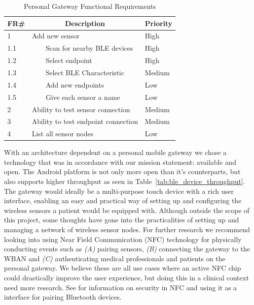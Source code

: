 \begin{table}[]
\centering
\caption{Personal Gateway Functional Requirements}
\label{tab:gatewayRequirements}
\begin{tabular}{|l|l|l|}
\hline
\textbf{FR\#} & \multicolumn{1}{c|}{\textbf{Description}} & \multicolumn{1}{c|}{\textbf{Priority}} \\ \hline
1             & Add new sensor                            & High                                   \\ \hline
1.1           & \ \ \ \ Scan for nearby BLE devices               & High                                   \\ \hline
1.2           & \ \ \ \ Select endpoint                           & High                                   \\ \hline
1.3           & \ \ \ \ Select BLE Characteristic                 & Medium                                 \\ \hline
1.4           & \ \ \ \ Add new endpoints                         & Low                                 \\ \hline
1.5           & \ \ \ \ Give each sensor a name                   & Low                                    \\ \hline
2             & Ability to test sensor connection         & Medium                                 \\ \hline
3             & Ability to test endpoint connection      & Medium                                 \\ \hline
4             & List all sensor nodes                     & Low                                    \\ \hline
\end{tabular}
\end{table}
\noindent
With an architecture dependent on a personal mobile gateway we chose a technology that was in accordance with our mission statement: available and open. The Android platform is not only more open than it's counterparts, but also supports higher throughput as seen in Table~\ref{tab:ble_device_throughput}.
The gateway would ideally be a multi-purpose touch device with a rich user interface, enabling an easy and practical way of setting up and configuring the wireless sensors a patient would be equipped with. Although outside the scope of this project, some thoughts have gone into the practicalities of setting up and managing a network of wireless sensor nodes. For further research we recommend looking into using Near Field Communication (NFC) technology for physically conducting events such as \emph{(A)} pairing sensors, \emph{(B)} connecting the gateway to the WBAN and \emph{(C)} authenticating medical professionals and patients on the personal gateway. We believe these are all use cases where an active NFC chip could drastically improve the user experience, but doing this in a clinical context need more research. See \cite{atp:2006ue} for information on security in NFC and using it as a interface for pairing Bluetooth devices.


